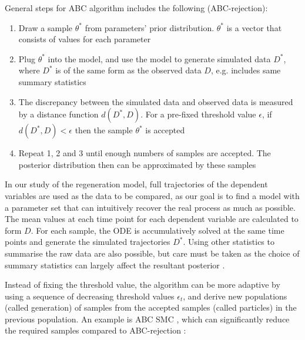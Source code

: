 General steps for ABC algorithm includes the following (ABC-rejection):

\begin{enumerate}
    \item Draw a sample $\theta^*$ from parameters' prior distribution. $\theta^*$ is a vector that consists of values for each parameter
    \item Plug $\theta^*$ into the model, and use the model to generate simulated data $D^*$, where $D^*$ is of the same form as the observed data $D$, e.g. includes same summary statistics
    \item The discrepancy between the simulated data and observed data is measured by a distance function $d(D^*, D)$. For a pre-fixed threshold value $\epsilon$, if $d(D^*, D)<\epsilon$ then the sample $\theta^*$ is accepted
    \item Repeat 1, 2 and 3 until enough numbers of samples are accepted. The posterior distribution then can be approximated by these samples
\end{enumerate}

In our study of the regeneration model, full trajectories of the dependent variables are used as the data to be compared, as our goal is to find a model with a parameter set that can intuitively recover the real process as much as possible. The mean values at each time point for each dependent variable are calculated to form $D$. For each sample, the ODE is accumulatively solved at the same time points and generate the simulated trajectories $D^*$. Using other statistics to summarise the raw data are also possible, but care must be taken as the choice of summary statistics can largely affect the resultant posterior \cite{summaryD, summaryD2}.

Instead of fixing the threshold value, the algorithm can be more adaptive by using a sequence of decreasing threshold values $\epsilon_t$, and derive new populations (called generation) of samples from the accepted samples (called particles) in the previous population. An example is ABC SMC \cite{Toni}, which can significantly reduce the required samples compared to ABC-rejection \cite{ref:disease}:

